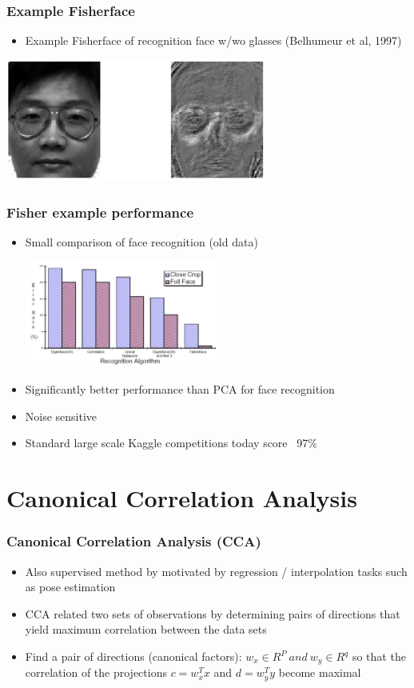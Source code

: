 \documentclass[10pt]{beamer}
\begin{document}
\begin{frame}
  \frametitle{Example Fisherface}
  \begin{itemize}
  \item Example Fisherface of recognition face w/wo glasses (Belhumeur et al, 1997)
  \end{itemize}
  \centerline{\includegraphics[height=4cm]{fisherface}}
\end{frame}

\begin{frame}
  \frametitle{Fisher example performance}
  \begin{itemize}
  \item Small comparison of face recognition (old data)
    \centerline{\includegraphics[height=3.5cm]{fisher-performance}}
  \item Significantly better performance than PCA for face recognition
  \item Noise sensitive
  \item Standard large scale Kaggle competitions today score ~97\%
  \end{itemize}
\end{frame}


\section{Canonical Correlation Analysis }
\label{sec:cca}

\begin{frame}
  \frametitle{Canonical Correlation Analysis (CCA)}
  \begin{itemize}
  \item Also supervised method by motivated by regression /
    interpolation tasks such as {\color{red} pose estimation}
  \item CCA related two sets of observations by determining pairs of directions that yield
    maximum correlation between the data sets
  \item Find a pair of directions (canonical factors):
    $ w_x \in R^P ~and ~w_y \in R^q $ so that the correlation of the
    projections $c = w_x^T x$ and $d = w_y^T y$ become maximal
  \end{itemize}
\end{frame}
\end{document}

